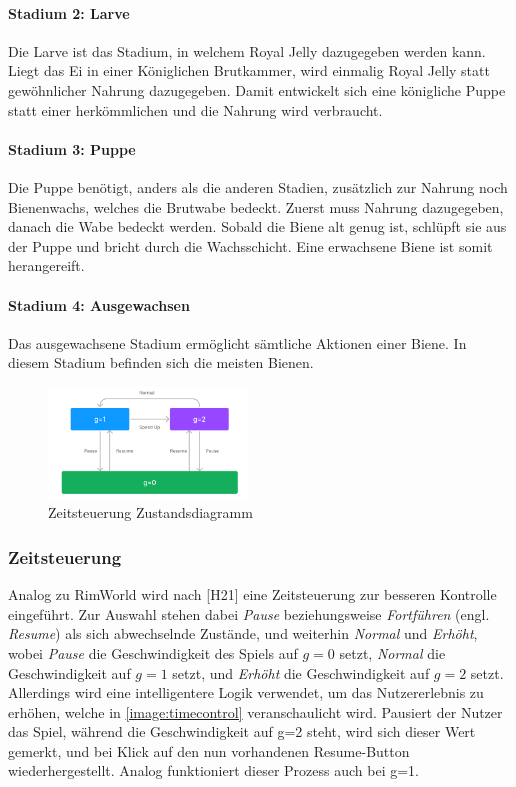 \paragraph{Stadium 2: Larve} Die Larve ist das Stadium, in welchem Royal Jelly dazugegeben werden kann. Liegt das Ei in einer Königlichen Brutkammer, wird einmalig Royal Jelly statt gewöhnlicher Nahrung dazugegeben. Damit entwickelt sich eine königliche Puppe statt einer herkömmlichen und die Nahrung wird verbraucht.

\paragraph{Stadium 3: Puppe} Die Puppe benötigt, anders als die anderen Stadien, zusätzlich zur Nahrung noch Bienenwachs, welches die Brutwabe bedeckt. Zuerst muss Nahrung dazugegeben, danach die Wabe bedeckt werden. Sobald die Biene alt genug ist, schlüpft sie aus der Puppe und bricht durch die Wachsschicht. Eine erwachsene Biene ist somit herangereift.

\paragraph{Stadium 4: Ausgewachsen} Das ausgewachsene Stadium ermöglicht sämtliche Aktionen einer Biene. In diesem Stadium befinden sich die meisten Bienen. 

\begin{figure}
    \begin{center}
        \includegraphics[width=200px]{0.bilder/timecontrol.png}
    \end{center}
    \caption{Zeitsteuerung Zustandsdiagramm} \label{image:timecontrol}
\end{figure}

\subsubsection{Zeitsteuerung}
Analog zu RimWorld wird nach [H21] eine Zeitsteuerung zur besseren Kontrolle eingeführt. Zur Auswahl stehen dabei \textit{Pause} beziehungsweise \textit{Fortführen} (engl. \textit{Resume}) als sich abwechselnde Zustände, und weiterhin \textit{Normal} und \textit{Erhöht}, wobei \textit{Pause} die Geschwindigkeit des Spiels auf $g=0$ setzt, \textit{Normal} die Geschwindigkeit auf $g=1$ setzt, und \textit{Erhöht} die Geschwindigkeit auf $g=2$ setzt. Allerdings wird eine intelligentere Logik verwendet, um das Nutzererlebnis zu erhöhen, welche in \autoref{image:timecontrol} veranschaulicht wird. Pausiert der Nutzer das Spiel, während die Geschwindigkeit auf g=2 steht, wird sich dieser Wert gemerkt, und bei Klick auf den nun vorhandenen Resume-Button wiederhergestellt. Analog funktioniert dieser Prozess auch bei g=1.

